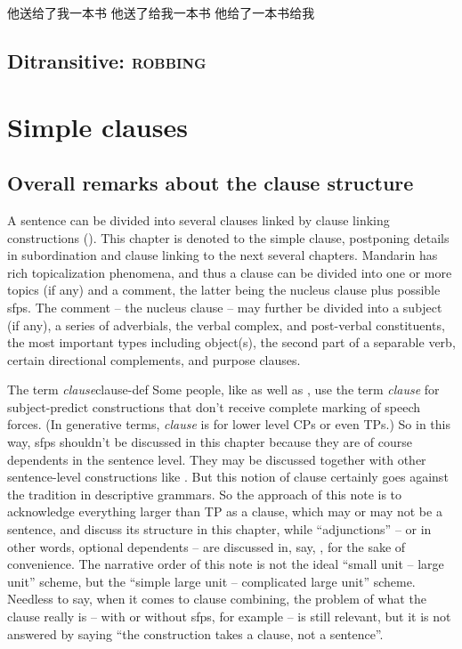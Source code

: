 \documentclass[UTF8, a4paper, oneside, scheme=plain, 12pt]{ctexrep}
\newcommand*{\citepage}[1]{p.~{#1}}
\newcommand*{\term}[1]{\emph{#1}}
\newcommand*{\category}[1]{\textsc{#1}}
\begin{document}
\begin{exe}
    \ex 他送给了我一本书
    \ex 他送了给我一本书
    \ex 他给了一本书给我
    \ex 
\end{exe}

\section{Ditransitive: \category{robbing}}

\chapter{Simple clauses}\label{chap:simple-clause}

\section{Overall remarks about the clause structure}

A sentence can be divided into several clauses linked by clause linking constructions 
().
This chapter is denoted to the simple clause,
postponing details in subordination and clause linking to the next several chapters.
Mandarin has rich topicalization phenomena,
and thus a clause can be divided into
one or more topics (if any) and a comment,
the latter being the nucleus clause
plus possible \acl{sfp}s.
The comment -- the nucleus clause -- may further be divided into a subject (if any),
a series of adverbials, 
the verbal complex, and post-verbal constituents,
the most important types including object(s), 
the second part of a separable verb,
certain directional complements,
and purpose clauses.

\begin{infobox}{The term \term{clause}}{clause-def}
    Some people, like \citet[\citepage{140}]{deng2010formal}
    as well as \citet{dixon2009basic},
    use the term \term{clause} for subject-predict constructions 
    that don't receive complete marking of speech forces.
    (In generative terms, \term{clause} is for lower level CPs or even TPs.)
    So in this way, \acl{sfp}s shouldn't be discussed in this chapter because 
    they are of course dependents in the sentence level.
    They may be discussed together with other sentence-level constructions like .
    But this notion of clause certainly goes against the tradition in descriptive grammars.
    So the approach of this note is to acknowledge everything larger than TP as a clause,
    which may or may not be a sentence,
    and discuss its structure in this chapter,
    while ``adjunctions'' -- or in other words, optional dependents -- 
    are discussed in, say, ,
    for the sake of convenience.
    The narrative order of this note is not the ideal ``small unit -- large unit'' scheme,
    but the ``simple large unit -- complicated large unit'' scheme.
    Needless to say,
    when it comes to clause combining, 
    the problem of what the clause really is -- with or without \ac{sfp}s, for example --
    is still relevant,
    but it is not answered by saying ``the construction takes a clause, not a sentence''.
\end{infobox}
\end{document}
